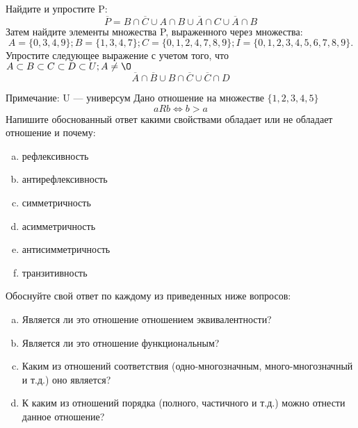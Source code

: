 \documentclass[10pt]{exam}
\begin{document}
\begin{questions}
\question
Найдите и упростите P:
\begin{equation*}
\overline{P} = B \cap \overline{C} \cup A \cap B \cup \overline{A} \cap C \cup \overline{A} \cap B
\end{equation*}
Затем найдите элементы множества P, выраженного через множества:
\begin{equation*}
A = \{0, 3, 4, 9\}; 
B = \{1, 3, 4, 7\};
C = \{0, 1, 2, 4, 7, 8, 9\};
I = \{0, 1, 2, 3, 4, 5, 6, 7, 8, 9\}.
\end{equation*}\question
Упростите следующее выражение с учетом того, что $A\subset B \subset C \subset D \subset U; A \neq \O$
\begin{equation*}
\overline{A} \cap \overline{B} \cup B \cap \overline{C} \cup \overline{C} \cap D
\end{equation*}

Примечание: U — универсум\question
Дано отношение на множестве $\{1, 2, 3, 4, 5\}$ 
\begin{equation*}
aRb \iff b > a
\end{equation*}
Напишите обоснованный ответ какими свойствами обладает или не обладает отношение и почему:   
\begin{enumerate} [a)]\setcounter{enumi}{0}
\item рефлексивность
\item антирефлексивность
\item симметричность
\item асимметричность
\item антисимметричность
\item транзитивность
\end{enumerate}

Обоснуйте свой ответ по каждому из приведенных ниже вопросов:
\begin{enumerate} [a)]\setcounter{enumi}{0}
    \item Является ли это отношение отношением эквивалентности?
    \item Является ли это отношение функциональным?
    \item Каким из отношений соответствия (одно-многозначным, много-многозначный и т.д.) оно является?
    \item К каким из отношений порядка (полного, частичного и т.д.) можно отнести данное отношение?
\end{enumerate}


\end{questions}
\end{document}
